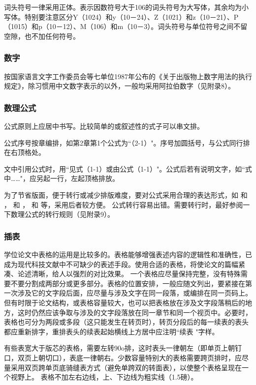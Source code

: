 词头符号一律采用正体。表示因数符号大于106的词头符号为大写体，其余均为小写体。特别要注意区分Y（1024）和y（10－24）、Z（1021）和z（10－21）、P（1015）和p（10－12）、M（106）和m（10－3）。词头符号与单位符号之间不留空隙，也不加任何符号。

\subsubsection{数字}\label{appendixA-6-2-7}
按国家语言文字工作委员会等七单位1987年公布的《关于出版物上数字用法的执行规定》，除习惯用中文数字表示的以外，一般均采用阿拉伯数字（见附录8）。

\subsubsection{数理公式}\label{appendixA-6-2-8}
公式原则上应居中书写。比较简单的或叙述性的式子可以串文排。

公式序号按章编排，如第2章第1个公式为``（2-1）"。序号加圆括号，与公式同行排在右顶格处。

文中引用公式时，用``见式（1-1）或由公式（1-1）"。公式后若有说明文字，如``式中……"，应另起一行，左起顶格排放。

为了节省版面，便于转行或减少排版难度，要对公式采用合理的表达形式，如 和 ， 和 ， 和 等，采用后者较方便。
公式转行容易出错。需要转行时，最好参阅一下数理公式的转行规则（见附录9）。

\subsubsection{插表}\label{appendixA-6-2-9}
学位论文中表格的运用是比较多的。表格能够增强表述内容的逻辑性和准确性，已成为现代科技文献中不可缺少的表述手段。使用合适的表格，将使论文的篇幅紧凑、论述清晰，给人以强烈的对比效果。
一个表格应尽量保持完整，没有特殊需要不要分割成两部分或更多部分。表格的位置安排，一般应随文列出，要紧接在第一次涉及它的文字段后面，应尽量与涉及文字在同一段落，或编排在同一页码上。但有时限于论文结构，或表格容量较大，也可以把表格放在涉及文字段落稍后的地方，这时仍然应该争取与涉及的文字段落放在同一章节和同一个视页中。必要时，表格也可分为两段或多段（这只能发生在转页时），转页分段后的每一续表的表头都应重新排字，重排表头的续表起始横线上方居中应注明``续表 "字样。

有些表宽大于版芯的表格，需要左转90o排，这时表头一律朝左（即单页上朝钉口，双页上朝切口），表底一律朝右。少数容量特别大的表格需要跨页排时，应尽量采用双页跨单页底骑缝表方式（避免单跨双的转面表），以使整个表格呈现在一个视野上。
表格不加左右边线，上、下边线为粗实线（1.5磅）。

